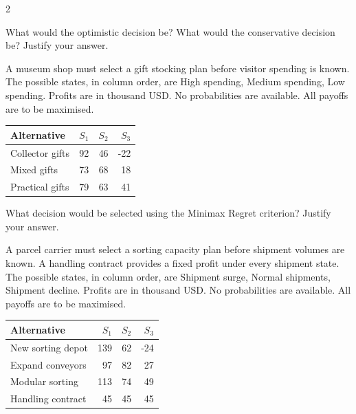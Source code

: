 \begin{multicols}{2}
\begin{minipage}{\linewidth}
What would the optimistic decision be? What would the conservative decision be? Justify your answer. 
\end{minipage}\par

\begin{minipage}{\linewidth}
A museum shop must select a gift stocking plan before visitor spending is known. The possible states, in column order, are High spending, Medium spending, Low spending. Profits are in thousand USD. No probabilities are available. All payoffs are to be maximised.
\begin{center}\small\setlength{\tabcolsep}{4pt}
\begin{tabular}{@{}lrrr@{}}\toprule
Alternative&$S_1$&$S_2$&$S_3$\\\midrule
Collector gifts&92&46&-22\\
Mixed gifts&73&68&18\\
Practical gifts&79&63&41\\\bottomrule
\end{tabular}\end{center}

What decision would be selected using the Minimax Regret criterion? Justify your answer. 
\end{minipage}\par

\begin{minipage}{\linewidth}
A parcel carrier must select a sorting capacity plan before shipment volumes are known. A handling contract provides a fixed profit under every shipment state. The possible states, in column order, are Shipment surge, Normal shipments, Shipment decline. Profits are in thousand USD. No probabilities are available. All payoffs are to be maximised.
\begin{center}\small\setlength{\tabcolsep}{4pt}
\begin{tabular}{@{}lrrr@{}}\toprule
Alternative&$S_1$&$S_2$&$S_3$\\\midrule
New sorting depot&139&62&-24\\
Expand conveyors&97&82&27\\
Modular sorting&113&74&49\\
Handling contract&45&45&45\\\bottomrule
\end{tabular}\end{center}


\end{minipage}
\end{multicols}
